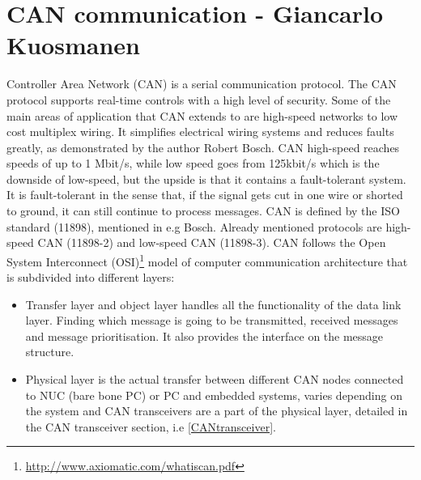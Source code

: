 \section{CAN communication - Giancarlo Kuosmanen}
Controller Area Network (CAN) is a serial communication protocol. The CAN protocol supports real-time controls with a high level of security. Some of the main areas of application that CAN extends to are high-speed networks to low cost multiplex wiring. It simplifies electrical wiring systems and reduces faults greatly, as demonstrated by the author Robert Bosch\cite{bosch}. CAN high-speed reaches speeds of up to 1 Mbit/s, while low speed goes from 125kbit/s which is the downside of low-speed, but the upside is that it contains a fault-tolerant system. It is fault-tolerant in the sense that, if the signal gets cut in one wire or shorted to ground, it can still continue to process messages\cite{Kvaser}.
CAN is defined by the ISO standard (11898), mentioned in e.g Bosch\cite{bosch}. Already mentioned protocols are high-speed CAN (11898-2) and low-speed CAN (11898-3). CAN follows the Open System Interconnect (OSI)\footnote{\url{http://www.axiomatic.com/whatiscan.pdf}} model of computer communication architecture that is subdivided into different layers:

\begin{itemize}
    \item Transfer layer and object layer handles all the functionality of the data link layer. Finding which message is going to be transmitted, received messages and message prioritisation. It also provides the interface on the message structure.
    \item Physical layer is the actual transfer between different CAN nodes connected to NUC (bare bone PC) or PC and embedded systems, varies depending on the system and CAN transceivers are a part of the physical layer, detailed in the CAN transceiver section, i.e \ref{CANtransceiver}.
\end{itemize}

